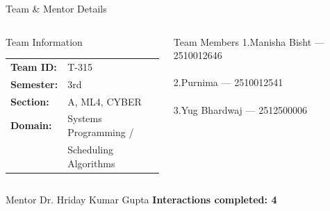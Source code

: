 \documentclass[aspectratio=169,11pt]{beamer}
\begin{document}
\begin{frame}{Team \& Mentor Details}

\begin{columns}[T,totalwidth=\textwidth]


\begin{block}{Team Information}
\begin{tabular}{@{}ll@{}}
\textbf{Team ID:} & T-315\\
\textbf{Semester:} & 3rd\\
\textbf{Section:} & A, ML4, CYBER\\
\textbf{Domain:} & Systems Programming /\\
                 & Scheduling Algorithms
\end{tabular}
\end{block}


\begin{block}{Team Members}
\scriptsize
1.\quad Manisha Bisht --- 2510012646\\
\\[1mm]
2.\quad Purnima --- 2510012541\\
\\[1mm]
3.\quad Yug Bhardwaj --- 2512500006\\
\end{block}

\end{columns}

\vspace{2mm}

\begin{block}{Mentor}
Dr. Hriday Kumar Gupta
\hfill
\textbf{Interactions completed: 4}
\end{block}

\vfill

\end{frame}
\end{document}
